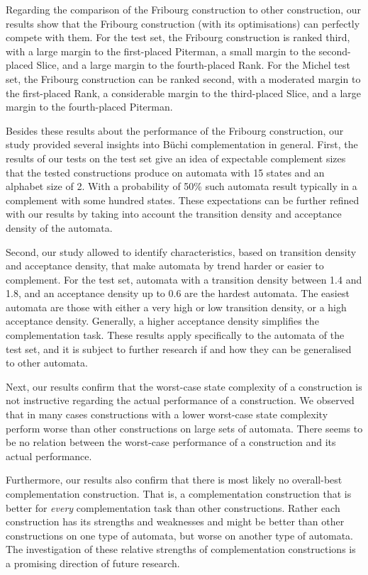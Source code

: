 Regarding the comparison of the Fribourg construction to other construction, our results show that the Fribourg construction (with its optimisations) can perfectly compete with them. For the \goal{} test set, the Fribourg construction is ranked third, with a large margin to the first-placed Piterman, a small margin to the second-placed Slice, and a large margin to the fourth-placed Rank. For the Michel test set, the Fribourg construction can be ranked second, with a moderated margin to the first-placed Rank, a considerable margin to the third-placed Slice, and a large margin to the fourth-placed Piterman.

Besides these results about the performance of the Fribourg construction, our study provided several insights into Büchi complementation in general. First, the results of our tests on the \goal{} test set give an idea of expectable complement sizes that the tested constructions produce on automata with 15 states and an alphabet size of 2. With a probability of 50\% such automata result typically in a complement with some hundred states. These expectations can be further refined with our results by taking into account the transition density and acceptance density of the automata.

Second, our study allowed to identify characteristics, based on transition density and acceptance density, that make automata by trend harder or easier to complement. For the \goal{} test set, automata with a transition density between 1.4 and 1.8, and an acceptance density up to 0.6 are the hardest automata. The easiest automata are those with either a very high or low transition density, or a high acceptance density. Generally, a higher acceptance density simplifies the complementation task. These results apply specifically to the automata of the \goal{} test set, and it is subject to further research if and how they can be generalised to other automata.

Next, our results confirm that the worst-case state complexity of a construction is not instructive regarding the actual performance of a construction. We observed that in many cases constructions with a lower worst-case state complexity perform worse than other constructions on large sets of automata. There seems to be no relation between the worst-case performance of a construction and its actual performance.

Furthermore, our results also confirm that there is most likely no overall-best complementation construction. That is, a complementation construction that is better for \textit{every} complementation task than other constructions. Rather each construction has its strengths and weaknesses and might be better than other constructions on one type of automata, but worse on another type of automata. The investigation of these relative strengths of complementation constructions is a promising direction of future research.

